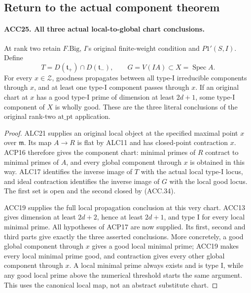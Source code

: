 \subsection{Return to the actual component theorem}

\paragraph{ACC25. All three actual local-to-global chart conclusions.}
\label{claim:ACC25}
At rank two retain \(F.\mathrm{Big}\), \(I\)'s original
finite-weight condition and \(P1'(S,I)\).  Define
\[
 T=D(\mathfrak t_+)\cap D(\mathfrak t_-),\qquad
 G=V(IA)\subset X=\operatorname{Spec}A.                   \tag{ACC.34}
\]
For every \(x\in\mathcal Z\), goodness propagates between
all type-I irreducible components through \(x\), and at least
one type-I component passes through \(x\).  If an original
chart at \(x\) has a good type-I prime of dimension at least
\(2d+1\), some type-I component of \(X\) is wholly good.
These are the three literal conclusions of the original
rank-two \(\mathrm{at\_pt}\) application.

\begin{proof}
ALC21 supplies an original local object at the specified maximal
point \(x\) over \(\mathfrak m\).  Its map \(A\to R\)
is flat by ALC11 and has closed-point contraction \(x\).
ACP16 therefore gives the component chart: minimal primes of
\(R\) contract to minimal primes of \(A\), and every global
component through \(x\) is obtained in this way.  ALC17 identifies
the inverse image of \(T\) with the actual local type-I locus,
and ideal contraction identifies the inverse image of \(G\)
with the local good locus.  The first set is open and the second
closed by (ACC.34).

ACC19 supplies the full local propagation conclusion at this very
chart.  ACC13 gives dimension at least \(2d+2\), hence at least
\(2d+1\), and type I for every local minimal prime.  All
hypotheses of ACP17 are now supplied.  Its first, second and third
parts give exactly the three asserted conclusions.  More concretely,
a good global component through \(x\) gives a good local minimal
prime; ACC19 makes every local minimal prime good, and contraction
gives every other global component through \(x\).  A local
minimal prime always exists and is type I, while any good local
prime above the numerical threshold starts the same argument.
This uses the canonical local map, not an abstract substitute chart.
\end{proof}

